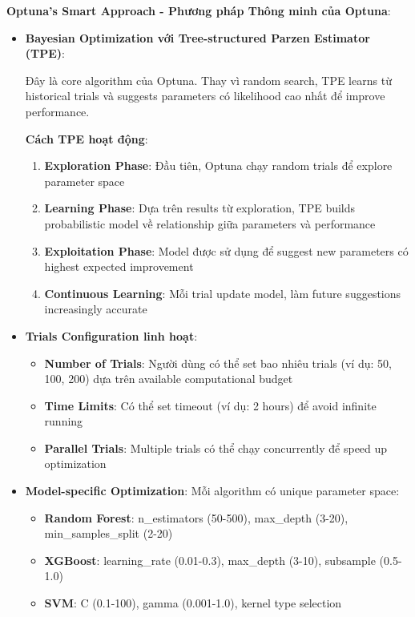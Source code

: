 \textbf{Optuna's Smart Approach - Phương pháp Thông minh của Optuna}:
\begin{itemize}[leftmargin=*]
    \item \textbf{Bayesian Optimization với Tree-structured Parzen Estimator (TPE)}: 
    
    Đây là core algorithm của Optuna. Thay vì random search, TPE learns từ historical trials và suggests parameters có likelihood cao nhất để improve performance.
    
    \textbf{Cách TPE hoạt động}:
    \begin{enumerate}[leftmargin=*]
        \item \textbf{Exploration Phase}: Đầu tiên, Optuna chạy random trials để explore parameter space
        \item \textbf{Learning Phase}: Dựa trên results từ exploration, TPE builds probabilistic model về relationship giữa parameters và performance
        \item \textbf{Exploitation Phase}: Model được sử dụng để suggest new parameters có highest expected improvement
        \item \textbf{Continuous Learning}: Mỗi trial update model, làm future suggestions increasingly accurate
    \end{enumerate}
    
    \item \textbf{Trials Configuration linh hoạt}:
    \begin{itemize}[leftmargin=*]
        \item \textbf{Number of Trials}: Người dùng có thể set bao nhiêu trials (ví dụ: 50, 100, 200) dựa trên available computational budget
        \item \textbf{Time Limits}: Có thể set timeout (ví dụ: 2 hours) để avoid infinite running
        \item \textbf{Parallel Trials}: Multiple trials có thể chạy concurrently để speed up optimization
    \end{itemize}
    
    \item \textbf{Model-specific Optimization}: Mỗi algorithm có unique parameter space:
    \begin{itemize}[leftmargin=*]
        \item \textbf{Random Forest}: n\_estimators (50-500), max\_depth (3-20), min\_samples\_split (2-20)
        \item \textbf{XGBoost}: learning\_rate (0.01-0.3), max\_depth (3-10), subsample (0.5-1.0)
        \item \textbf{SVM}: C (0.1-100), gamma (0.001-1.0), kernel type selection
    \end{itemize}
    

\end{itemize}
